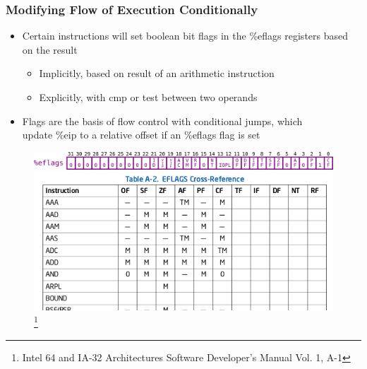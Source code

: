 \documentclass[11pt,xcolor=dvipsnames]{beamer}
\newcommand{\vs}{\vspace{0.5em}}
\newcommand{\mvs}{\vspace{-0.95em}}
\begin{document}
\begin{frame}[fragile,t]
\frametitle{Modifying Flow of Execution Conditionally}
\begin{itemize}
  \item Certain instructions will set boolean bit flags in the {\ttfamily \%eflags} registers based on the result
  \begin{itemize}
    \item Implicitly, based on result of an arithmetic instruction
    \item Explicitly, with {\ttfamily cmp} or {\ttfamily test} between two operands
  \end{itemize}
  \item Flags are the basis of flow control with conditional jumps, which \\ update {\ttfamily \%eip} to a relative offset if an {\ttfamily \%eflags} flag is set
\end{itemize}
\mvs
\begin{figure}
\centering
  \includegraphics[width=\textwidth]{figures/eflags.png} \\
  \vs
  \includegraphics[height=0.3\paperheight]{figures/ia32-eflags.png}\let\thefootnote\relax\footnote{Intel 64 and IA-32 Architectures Software Developer’s Manual Vol. 1, A-1}
\end{figure}
\end{frame}
\end{document}
